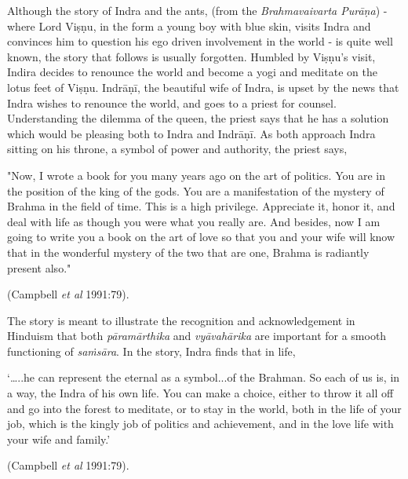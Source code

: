 \medskip

Although the story of Indra and the ants, (from the \textsl{Brahmavaivarta Purāṇa}) -  where Lord Viṣṇu, in the form a young boy with blue skin, visits Indra and convinces him to question his ego driven involvement in the world - is quite well known, the story that follows is usually forgotten. Humbled by Viṣṇu's visit, Indira decides to renounce the world and become a yogi and meditate on the lotus feet of Viṣṇu. Indrāṇī, the beautiful wife of Indra, is upset by the news that Indra wishes to renounce the world, and goes to a priest for counsel. Understanding the dilemma of the queen, the priest says that he has a solution which would be pleasing both to Indra and Indrāṇī. As both approach Indra sitting on his throne, a symbol of power and authority, the priest says, 

\begin{myquote}
"Now, I wrote a book for you many years ago on the art of politics. You are in the position of the king of the gods. You are a manifestation of the mystery of Brahma in the field of time. This is a high privilege. Appreciate it, honor it, and deal with life as though you were what you really are. And besides, now I am going to write you a book on the art of love so that you and your wife will know that in the wonderful mystery of the two that are one, Brahma is radiantly present also." 

\hfill (Campbell \textsl{et al} 1991:79).
\end{myquote}

The story is meant to illustrate the recognition and acknowledgement in Hinduism that both \textsl{pāramārthika} and \textsl{vyāvahārika} are important for a smooth functioning of \textsl{saṁsāra}. In the story, Indra finds that in life, 

\begin{myquote}
‘…..he can represent the eternal as a symbol...of the Brahman. So each of us is, in a way, the Indra of his own life. You can make a choice, either to throw it all off and go into the forest to meditate, or to stay in the world, both in the life of your job, which is the kingly job of politics and achievement, and in the love life with your wife and family.’

\hfill (Campbell \textsl{et al} 1991:79).
\end{myquote}

